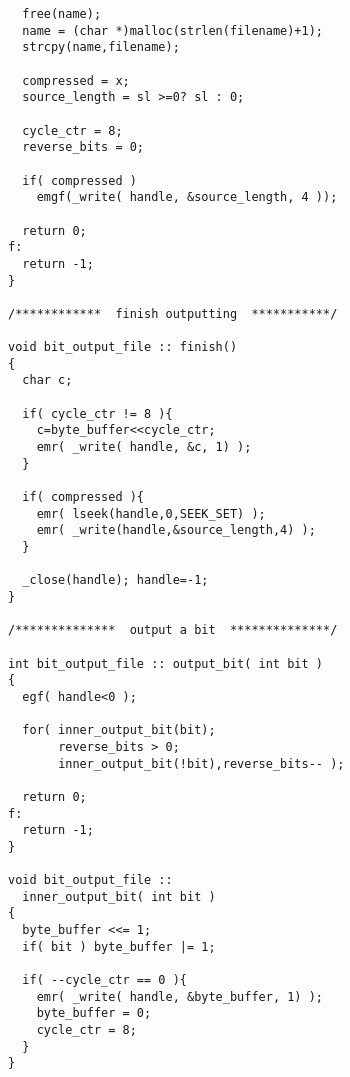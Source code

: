 \begin{verbatim}
  free(name);
  name = (char *)malloc(strlen(filename)+1);
  strcpy(name,filename);

  compressed = x;
  source_length = sl >=0? sl : 0;

  cycle_ctr = 8;
  reverse_bits = 0;

  if( compressed )
    emgf(_write( handle, &source_length, 4 ));

  return 0;
f:
  return -1;
}

/************  finish outputting  ***********/

void bit_output_file :: finish()
{
  char c;

  if( cycle_ctr != 8 ){
    c=byte_buffer<<cycle_ctr;
    emr( _write( handle, &c, 1) );
  }

  if( compressed ){
    emr( lseek(handle,0,SEEK_SET) );
    emr( _write(handle,&source_length,4) );
  }

  _close(handle); handle=-1;
}

/**************  output a bit  **************/

int bit_output_file :: output_bit( int bit )
{
  egf( handle<0 );

  for( inner_output_bit(bit);
       reverse_bits > 0;
       inner_output_bit(!bit),reverse_bits-- );

  return 0;
f:
  return -1;
}

void bit_output_file ::
  inner_output_bit( int bit )
{
  byte_buffer <<= 1;
  if( bit ) byte_buffer |= 1;

  if( --cycle_ctr == 0 ){
    emr( _write( handle, &byte_buffer, 1) );
    byte_buffer = 0;
    cycle_ctr = 8;
  }
}
\end{verbatim}
